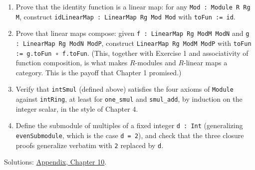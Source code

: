 \begin{enumerate}
\item
  Prove that the identity function is a linear map: for any \texttt{Mod : Module R Rg M}, construct \texttt{idLinearMap : LinearMap Rg Mod Mod} with \texttt{toFun := id}.
\item
  Prove that linear maps compose: given \texttt{f : LinearMap Rg ModM ModN} and \texttt{g : LinearMap Rg ModN ModP}, construct \texttt{LinearMap Rg ModM ModP} with \texttt{toFun := g.toFun ∘ f.toFun}. (This, together with Exercise 1 and associativity of function composition, is what makes \(R\)-modules and \(R\)-linear maps a category. This is the payoff that Chapter 1 promised.)
\item
  Verify that \texttt{intSmul} (defined above) satisfies the four axioms of \texttt{Module} against \texttt{intRing}, at least for \texttt{one\_\allowbreak{}smul} and \texttt{smul\_\allowbreak{}add}, by induction on the integer scalar, in the style of Chapter 4.
\item
  Define the submodule of multiples of a fixed integer \texttt{d : Int} (generalizing \texttt{evenSubmodule}, which is the case \texttt{d = 2}), and check that the three closure proofs generalize verbatim with \texttt{2} replaced by \texttt{d}.
\end{enumerate}

Solutions: \hyperref[sec:14-appendix-solutions:09-chapter-10:1]{Appendix, Chapter 10}.

